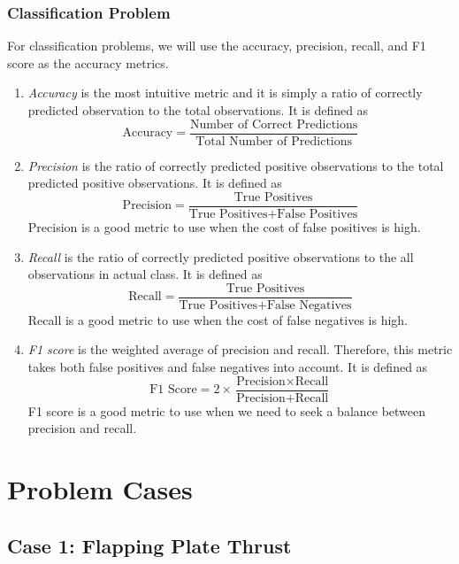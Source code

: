 \documentclass[conf]{new-aiaa}
\begin{document}
\subsubsection{Classification Problem}
For classification problems, we will use the accuracy, precision, recall, and F1 score as the accuracy metrics.
\begin{enumerate}
\item \textit{Accuracy} is the most intuitive metric and it is simply a ratio of correctly predicted observation to the total observations. It is defined as
\begin{equation} \label{eq:accuracy}
    \textrm{Accuracy} = \frac{\textrm{Number of Correct Predictions}}{\textrm{Total Number of Predictions}}
\end{equation}
\item \textit{Precision} is the ratio of correctly predicted positive observations to the total predicted positive observations. It is defined as
\begin{equation} \label{eq:precision}
    \textrm{Precision} = \frac{\textrm{True Positives}}{\textrm{True Positives} + \textrm{False Positives}}
\end{equation}
Precision is a good metric to use when the cost of false positives is high.
\item \textit{Recall} is the ratio of correctly predicted positive observations to the all observations in actual class. It is defined as
\begin{equation} \label{eq:recall}
    \textrm{Recall} = \frac{\textrm{True Positives}}{\textrm{True Positives} + \textrm{False Negatives}}
\end{equation}
Recall is a good metric to use when the cost of false negatives is high.
\item \textit{F1 score} is the weighted average of precision and recall. Therefore, this metric takes both false positives and false negatives into account. It is defined as
\begin{equation} \label{eq:f1score}
    \textrm{F1 Score} = 2 \times \frac{\textrm{Precision} \times \textrm{Recall}}{\textrm{Precision} + \textrm{Recall}}
\end{equation}
F1 score is a good metric to use when we need to seek a balance between precision and recall.
\end{enumerate}
\section{Problem Cases}
\subsection{Case 1: Flapping Plate Thrust}
\end{document}
